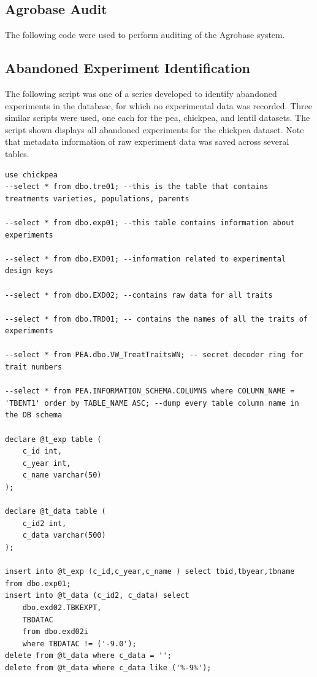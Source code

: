 \documentclass[12pt, letterpaper,oneocolumn]{article}
\begin{document}
	\newpage

	\begin{appendices}

		\section{Agrobase Audit}

		The following code were used to perform auditing of the Agrobase system.\\
		\subsection{Abandoned Experiment Identification}
		The following script was one of a series developed to identify abandoned experiments in the database, for which no experimental data was recorded. Three similar scripts were used, one each for the pea, chickpea, and lentil datasets. The script shown displays all abandoned experiments for the chickpea dataset. Note that metadata information of raw experiment data was saved across several tables.

		\lstset{language=SQL}
		\begin{lstlisting}
use chickpea
--select * from dbo.tre01; --this is the table that contains treatments varieties, populations, parents

--select * from dbo.exp01; --this table contains information about experiments

--select * from dbo.EXD01; --information related to experimental design keys

--select * from dbo.EXD02; --contains raw data for all traits

--select * from dbo.TRD01; -- contains the names of all the traits of experiments

--select * from PEA.dbo.VW_TreatTraitsWN; -- secret decoder ring for trait numbers

--select * from PEA.INFORMATION_SCHEMA.COLUMNS where COLUMN_NAME = 'TBENT1' order by TABLE_NAME ASC; --dump every table column name in the DB schema

declare @t_exp table (
	c_id int,
	c_year int,
	c_name varchar(50)
);

declare @t_data table (
	c_id2 int,
	c_data varchar(500)
);

insert into @t_exp (c_id,c_year,c_name ) select tbid,tbyear,tbname from dbo.exp01;
insert into @t_data (c_id2, c_data) select
	dbo.exd02.TBKEXPT,
	TBDATAC
	from dbo.exd02i
	where TBDATAC != ('-9.0');
delete from @t_data where c_data = '';
delete from @t_data where c_data like ('%-9%');



\end{lstlisting}
\end{appendices}
\end{document}
